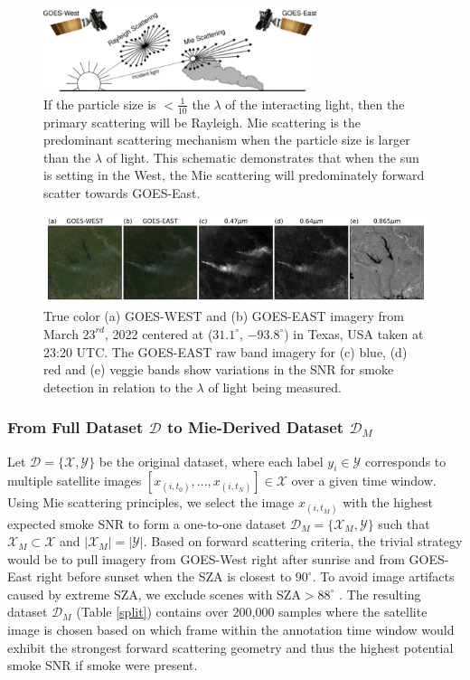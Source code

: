 \documentclass{article}
\begin{document}
\begin{figure}[!htb]
    \centering
    \includegraphics[width=8cm]{figures/mei_small.png}
    \caption{If the particle size is \(<\frac{1}{10}\) the \(\lambda\) of the interacting light, then the primary scattering will be Rayleigh. Mie scattering is the predominant scattering mechanism when the particle size is larger than the \(\lambda\) of light. This schematic demonstrates that when the sun is setting in the West, the Mie scattering will predominately forward scatter towards GOES-East.} \label{mei}
\end{figure}

\begin{figure}[!htb]
    \centering
    \includegraphics[width=\linewidth]{figures/GOES_WEST_EAST_B_R_V_small.png}
    \caption{True color (a) GOES-WEST and (b) GOES-EAST imagery from March \(23^{rd}\), 2022 centered at (\(31.1^{\circ}\), \(-93.8^{\circ}\)) in Texas, USA taken at 23:20 UTC. The GOES-EAST raw band imagery for (c) blue, (d) red and (e) veggie bands show variations in the SNR for smoke detection in relation to the \(\lambda\) of light being measured.}\label{WEST_EAST_bands}
\end{figure}

\subsubsection{From Full Dataset \(\mathcal{D}\) to Mie-Derived Dataset \(\mathcal{D}_M\)}

Let \(\mathcal{D} = \{\mathcal{X}, \mathcal{Y}\}\) be the original dataset, where each label \(y_i \in \mathcal{Y}\) corresponds to multiple satellite images \([x_{(i,t_0)},...,x_{(i,t_N)}] \in \mathcal{X}\) over a given time window. Using Mie scattering principles, we select the image \(x_{(i,t_M)}\) with the highest expected smoke SNR to form a one-to-one dataset \(\mathcal{D}_M = \{\mathcal{X}_M, \mathcal{Y}\}\) such that \(\mathcal{X}_M \subset \mathcal{X}\) and \(|\mathcal{X}_M| = |\mathcal{Y}|\). Based on forward scattering criteria, the trivial strategy would be to pull imagery from GOES-West right after sunrise and from GOES-East right before sunset when the SZA is closest to \(90^{\circ}\). To avoid image artifacts caused by extreme SZA, we exclude scenes with SZA\(>88^\circ\) \cite{zen_angle}. The resulting dataset \(\mathcal{D}_M\) (Table \ref{split}) contains over 200,000 samples where the satellite image is chosen based on which frame within the annotation time window would exhibit the strongest forward scattering geometry and thus the highest potential smoke SNR if smoke were present. 
\end{document}
